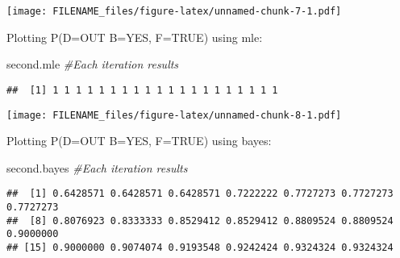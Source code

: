 \documentclass[
]{article}
\newenvironment{Shaded}{\begin{snugshade}}{\end{snugshade}}
\newcommand{\AttributeTok}[1]{\textcolor[rgb]{0.77,0.63,0.00}{#1}}
\newcommand{\CommentTok}[1]{\textcolor[rgb]{0.56,0.35,0.01}{\textit{#1}}}
\newcommand{\DecValTok}[1]{\textcolor[rgb]{0.00,0.00,0.81}{#1}}
\newcommand{\FunctionTok}[1]{\textcolor[rgb]{0.00,0.00,0.00}{#1}}
\newcommand{\NormalTok}[1]{#1}
\newcommand{\OtherTok}[1]{\textcolor[rgb]{0.56,0.35,0.01}{#1}}
\newcommand{\SpecialCharTok}[1]{\textcolor[rgb]{0.00,0.00,0.00}{#1}}
\newcommand{\StringTok}[1]{\textcolor[rgb]{0.31,0.60,0.02}{#1}}
\begin{document}
\texttt{[image: FILENAME\_files/figure-latex/unnamed-chunk-7-1.pdf]}

Plotting P(D=OUT \textbar{} B=YES, F=TRUE) using mle:

\begin{Shaded}
\begin{Highlighting}[]
\NormalTok{second.mle }\CommentTok{\#Each iteration results}
\end{Highlighting}
\end{Shaded}

\begin{verbatim}
##  [1] 1 1 1 1 1 1 1 1 1 1 1 1 1 1 1 1 1 1 1 1
\end{verbatim}

\begin{Shaded}
\end{Shaded}

\texttt{[image: FILENAME\_files/figure-latex/unnamed-chunk-8-1.pdf]}

Plotting P(D=OUT \textbar{} B=YES, F=TRUE) using bayes:

\begin{Shaded}
\begin{Highlighting}[]
\NormalTok{second.bayes }\CommentTok{\#Each iteration results}
\end{Highlighting}
\end{Shaded}

\begin{verbatim}
##  [1] 0.6428571 0.6428571 0.6428571 0.7222222 0.7727273 0.7727273 0.7727273
##  [8] 0.8076923 0.8333333 0.8529412 0.8529412 0.8809524 0.8809524 0.9000000
## [15] 0.9000000 0.9074074 0.9193548 0.9242424 0.9324324 0.9324324
\end{verbatim}
\end{document}
